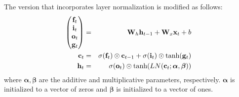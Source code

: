 \documentclass{article}
\begin{document}
The version that incorporates layer normalization is modified as follows:
\begin{eqnarray}
\begin{pmatrix}{\bf f}_t\\{\bf i}_t\\{\bf o}_t\\{\bf g}_t\end{pmatrix} &=& {\bf W}_h {\bf h}_{t-1} + {\bf W}_x {\bf x}_t + b \\
{\bf c}_t &=& \sigma({\bf f}_t) \odot {\bf c}_{t-1} + \sigma({\bf i}_t) \odot \text{tanh}({\bf g}_t) \\
{\bf h}_t &=& \sigma({\bf o}_t) \odot \text{tanh}(LN({\bf c}_t; \bm{\alpha}, \bm{\beta}))
\end{eqnarray}
where $\bm{\alpha}, \bm{\beta}$ are the additive and multiplicative parameters, respectively. $\bm{\alpha}$ is initialized to a vector of zeros and $\bm{\beta}$ is initialized to a vector of ones.
\end{document}
